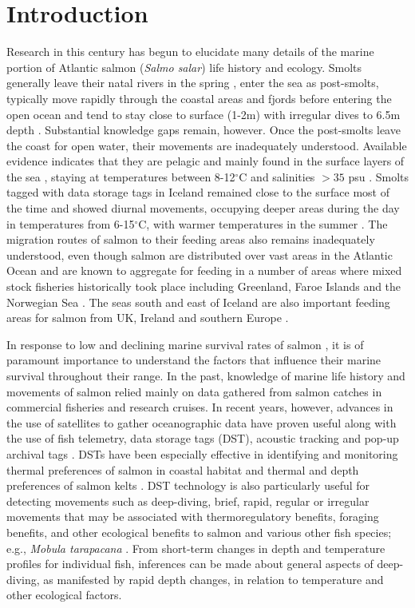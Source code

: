 \section{Introduction}
\label{intro}
Research in this century has begun to elucidate many details of the marine portion of Atlantic salmon (\textit{Salmo salar}) life history and ecology. 
Smolts generally leave their natal rivers in the spring \citep{Otero2014}, enter the sea as post-smolts, typically move rapidly through the coastal areas and fjords before entering the open ocean \citep{Thorstad2011,Lacroix2004,Gudjonsson2005} and tend to stay close to surface (1-2m) with irregular dives to 6.5m depth \citep{Davidsen2008}.  
Substantial knowledge gaps remain, however. 
Once the post-smolts leave the coast for open water, their movements are inadequately understood. 
Available evidence indicates that they are pelagic and mainly found in the surface layers of the sea \citep{Holm2006}, staying at temperatures between 8-12$^\circ$C \citep{Friedland2000} and salinities $> 35$ psu \citep{Holm2003}. 
Smolts tagged with data storage tags in Iceland remained close to the surface most of the time and showed diurnal movements, occupying deeper areas during the day in temperatures from 6-15$^\circ$C, with warmer temperatures in the summer \citep{Gudjonsson2015}. 
The migration routes of salmon to their feeding areas also remains inadequately understood, even though salmon are distributed over vast areas in the Atlantic Ocean and are known to aggregate for feeding in a number of areas where mixed stock fisheries historically took place including Greenland, Faroe Islands and the Norwegian Sea \citep{Chaput2012}. 
The seas south and east of Iceland are also important feeding areas for salmon from UK, Ireland and southern Europe \citep{Olafsson2015}. 

In response to low and declining marine survival rates of salmon \citep{Chaput2012}, it is of paramount importance to understand the factors that influence their marine survival throughout their range. 
In the past, knowledge of marine life history and movements of salmon relied mainly on data gathered from salmon catches in commercial fisheries and research cruises. 
In recent years, however, advances in the use of satellites to gather oceanographic data have proven useful along with the use of fish telemetry, data storage tags (DST), acoustic tracking and pop-up archival tags \citep{Lacroix2013}. 
DSTs have been especially effective in identifying and monitoring thermal preferences of salmon in coastal habitat \citep{Reddin2004,Reddin2006} and thermal and depth preferences of salmon kelts \citep{Reddin2011,Chittenden2013,Strom2017}. DST technology is also particularly useful for detecting movements such as deep-diving, brief, rapid, regular or irregular movements that may be associated with thermoregulatory benefits, foraging benefits, and other ecological benefits to salmon \citep{Reddin2006} and various other fish species; e.g., \textit{Mobula tarapacana} \citep{Thorrold2014}. 
From short-term changes in depth and temperature profiles for individual fish, inferences can be made about general aspects of deep-diving, as manifested by rapid depth changes, in relation to temperature and other ecological factors.

